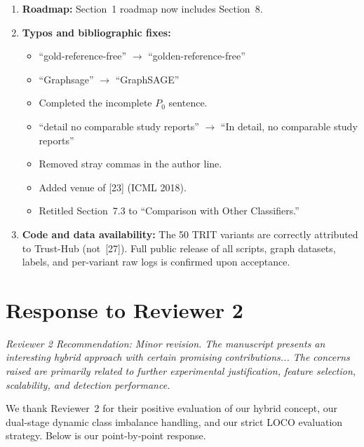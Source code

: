 \documentclass[11pt,a4paper]{article}
\begin{document}
\begin{enumerate}[leftmargin=*]
    \item[\textbf{M13.}] \textbf{Roadmap:} Section~1 roadmap now includes Section~8.

    \item[\textbf{M14.}] \textbf{Typos and bibliographic fixes:}
    \begin{itemize}
        \item ``gold-reference-free'' $\to$ ``golden-reference-free''
        \item ``Graphsage'' $\to$ ``GraphSAGE''
        \item Completed the incomplete $P_0$ sentence.
        \item ``detail no comparable study reports'' $\to$ ``In detail, no comparable study reports''
        \item Removed stray commas in the author line.
        \item Added venue of [23] (ICML 2018).
        \item Retitled Section~7.3 to ``Comparison with Other Classifiers.''
    \end{itemize}

    \item[\textbf{M15.}] \textbf{Code and data availability:} The 50 TRIT variants are correctly attributed to Trust-Hub (not~[27]). Full public release of all scripts, graph datasets, labels, and per-variant raw logs is confirmed upon acceptance.
\end{enumerate}

\newpage
\section*{\textcolor{reviewerblue}{\Large Response to Reviewer 2}}

\noindent\textit{Reviewer 2 Recommendation: Minor revision. The manuscript presents an interesting hybrid approach with certain promising contributions... The concerns raised are primarily related to further experimental justification, feature selection, scalability, and detection performance.}

\vspace{4pt}
\noindent We thank Reviewer~2 for their positive evaluation of our hybrid concept, our dual-stage dynamic class imbalance handling, and our strict LOCO evaluation strategy. Below is our point-by-point response.
\end{document}
